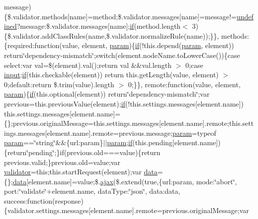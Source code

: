 \begin{DoxyCompactItemize}
message)\{\$.validator.\+methods\mbox{[}name\mbox{]}=method;\$.validator.\+messages\mbox{[}name\mbox{]}=message!=\hyperlink{_scripts_2jquery-1_810_82_8js_a08113a236cc18d2a9d5ce27e638012be}{undefined}?message\+:\$.\+validator.\+messages\mbox{[}name\mbox{]};\hyperlink{_scripts_2respond_8min_8js_a93851d60dd037a83509a1757b9ee7b66}{if}(method.\+length$<$ 3)\{\$.validator.\+add\+Class\+Rules(name,\$.validator.\+normalize\+Rule(name));\}\}, methods\+:\{required\+:function(value, element, \hyperlink{_scripts_2jquery-1_810_82_8min_8js_ae8915303d11557d1b001bc56b6195251}{param})\{\hyperlink{_scripts_2respond_8min_8js_a93851d60dd037a83509a1757b9ee7b66}{if}(!this.\+depend(\hyperlink{_scripts_2jquery-1_810_82_8min_8js_ae8915303d11557d1b001bc56b6195251}{param}, element)) return\char`\"{}dependency-\/mismatch\char`\"{};switch(element.\+node\+Name.\+to\+Lower\+Case())\{case \textquotesingle{}select\textquotesingle{}\+:var val=\$(element).val();return val \&\&val.\+length $>$ 0;case \textquotesingle{}\hyperlink{jquery_8unobtrusive-ajax_8min_8js_a22211e450825dd03852dfba097324407}{input}\textquotesingle{}\+:\hyperlink{_scripts_2respond_8min_8js_a93851d60dd037a83509a1757b9ee7b66}{if}(this.\+checkable(element)) return this.\+get\+Length(value, element) $>$ 0;default\+:return \$.trim(value).length $>$ 0;\}\}, remote\+:function(value, element, \hyperlink{_scripts_2jquery-1_810_82_8min_8js_ae8915303d11557d1b001bc56b6195251}{param})\{\hyperlink{_scripts_2respond_8min_8js_a93851d60dd037a83509a1757b9ee7b66}{if}(this.\+optional(element)) return\char`\"{}dependency-\/mismatch\char`\"{};var previous=this.\+previous\+Value(element);\hyperlink{_scripts_2respond_8min_8js_a93851d60dd037a83509a1757b9ee7b66}{if}(!this.\+settings.\+messages\mbox{[}element.\+name\mbox{]}) this.\+settings.\+messages\mbox{[}element.\+name\mbox{]}=\{\};previous.\+original\+Message=this.\+settings.\+messages\mbox{[}element.\+name\mbox{]}.remote;this.\+settings.\+messages\mbox{[}element.\+name\mbox{]}.remote=previous.\+message;\hyperlink{_scripts_2jquery-1_810_82_8min_8js_ae8915303d11557d1b001bc56b6195251}{param}=typeof \hyperlink{_scripts_2jquery-1_810_82_8min_8js_ae8915303d11557d1b001bc56b6195251}{param}==\char`\"{}string\char`\"{}\&\&\{url\+:param\}$\vert$$\vert$\hyperlink{_scripts_2jquery-1_810_82_8min_8js_ae8915303d11557d1b001bc56b6195251}{param};\hyperlink{_scripts_2respond_8min_8js_a93851d60dd037a83509a1757b9ee7b66}{if}(this.\+pending\mbox{[}element.\+name\mbox{]})\{return\char`\"{}pending\char`\"{};\}if(previous.\+old===value)\{return previous.\+valid;\}previous.\+old=value;var \hyperlink{_scripts_2jquery_8validate_8js_a2dc8272bb221cdffcccbd20db038f172}{validator}=this;this.\+start\+Request(element);var \hyperlink{jquery_8unobtrusive-ajax_8min_8js_a8f172ae31c11770303ca0c4cb48ceb3a}{data}=\{\};\hyperlink{jquery_8unobtrusive-ajax_8min_8js_a8f172ae31c11770303ca0c4cb48ceb3a}{data}\mbox{[}element.\+name\mbox{]}=value;\$.\hyperlink{_scripts_2jquery_8validate_8js_a77004c0fdc08a5bc07afa0b099cdf6df}{ajax}(\$.extend(true,\{url\+:param, mode\+:\char`\"{}abort\char`\"{}, port\+:\char`\"{}validate\char`\"{}+element.\+name, data\+Type\+:\char`\"{}json\char`\"{}, data\+:data, success\+:function(response)\{validator.\+settings.\+messages\mbox{[}element.\+name\mbox{]}.remote=previous.\+original\+Message;var 
\end{DoxyCompactItemize}
